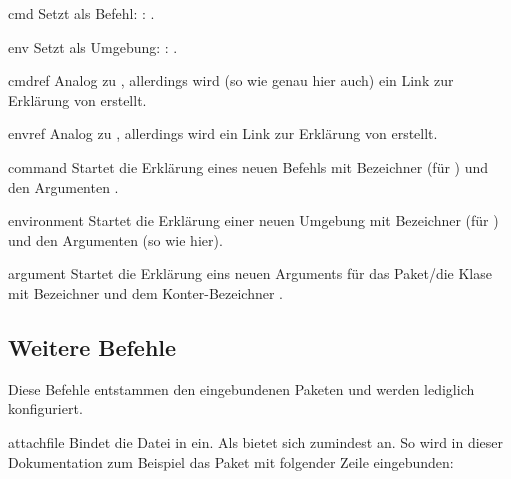 \documentclass{sopra-base}
\begin{document}
\begin{command}{cmd}{}
    Setzt  als Befehl: : .
\end{command}

\begin{command}{env}{}
    Setzt  als Umgebung: : .
\end{command}

\begin{command}{cmdref}{}
    Analog zu , allerdings wird (so wie genau hier auch) ein Link zur Erklärung von  erstellt.
\end{command}

\begin{command}{envref}{}
    Analog zu , allerdings wird ein Link zur Erklärung von  erstellt.
\end{command}

\begin{environment}{command}{}
    Startet die Erklärung eines neuen Befehls mit Bezeichner  (für ) und den Argumenten .
\end{environment}

\begin{environment}{environment}{}
    Startet die Erklärung einer neuen Umgebung mit Bezeichner  (für ) und den Argumenten  (so wie hier).
\end{environment}

\begin{environment}{argument}{}
    Startet die Erklärung eins neuen Arguments für das Paket/die Klase mit Bezeichner  und dem Konter-Bezeichner .
\end{environment}

\subsection{Weitere Befehle}

Diese Befehle entstammen den eingebundenen Paketen und werden lediglich konfiguriert.

\begin{command}{attachfile}{}
    Bindet die Datei in  ein. Als  bietet sich zumindest  an. So wird in dieser Dokumentation zum Beispiel das Paket mit folgender Zeile eingebunden:
\begin{plainlatex}
\end{plainlatex}
\end{command}
\end{document}
